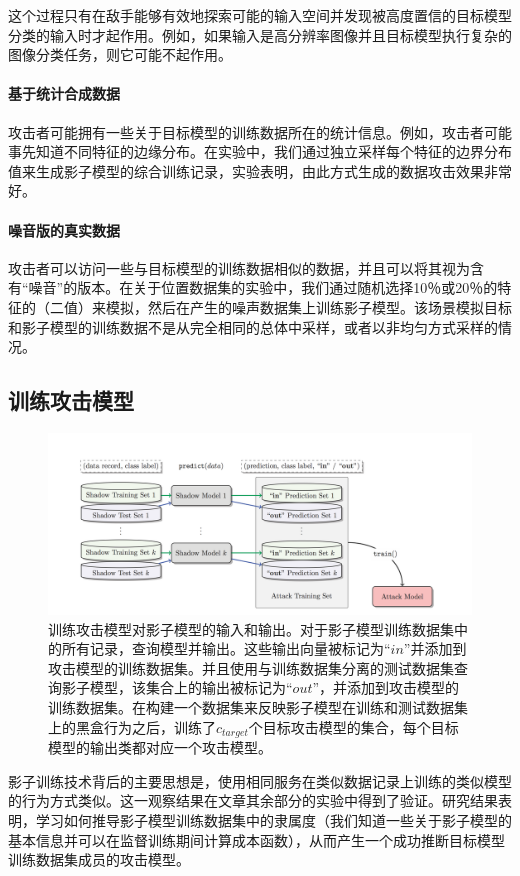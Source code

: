 \documentclass[a4paper]{article}
\begin{document}
这个过程只有在敌手能够有效地探索可能的输入空间并发现被高度置信的目标模型分类的输入时才起作用。例如，如果输入是高分辨率图像并且目标模型执行复杂的图像分类任务，则它可能不起作用。

\paragraph{基于统计合成数据}
攻击者可能拥有一些关于目标模型的训练数据所在的统计信息。例如，攻击者可能事先知道不同特征的边缘分布。在实验中，我们通过独立采样每个特征的边界分布值来生成影子模型的综合训练记录，实验表明，由此方式生成的数据攻击效果非常好。

\paragraph{噪音版的真实数据}
攻击者可以访问一些与目标模型的训练数据相似的数据，并且可以将其视为含有“噪音”的版本。在关于位置数据集的实验中，我们通过随机选择10％或20％的特征的（二值）来模拟，然后在产生的噪声数据集上训练影子模型。该场景模拟目标和影子模型的训练数据不是从完全相同的总体中采样，或者以非均匀方式采样的情况。

\subsection{训练攻击模型}

\begin{figure}
\includegraphics[width = \linewidth]{fig/training.png}
\caption{训练攻击模型对影子模型的输入和输出。对于影子模型训练数据集中的所有记录，查询模型并输出。这些输出向量被标记为$“in”$并添加到攻击模型的训练数据集。并且使用与训练数据集分离的测试数据集查询影子模型，该集合上的输出被标记为$“out”$，并添加到攻击模型的训练数据集。在构建一个数据集来反映影子模型在训练和测试数据集上的黑盒行为之后，训练了$c_{target}$个目标攻击模型的集合，每个目标模型的输出类都对应一个攻击模型。}
\end{figure}

影子训练技术背后的主要思想是，使用相同服务在类似数据记录上训练的类似模型的行为方式类似。这一观察结果在文章其余部分的实验中得到了验证。研究结果表明，学习如何推导影子模型训练数据集中的隶属度（我们知道一些关于影子模型的基本信息并可以在监督训练期间计算成本函数），从而产生一个成功推断目标模型训练数据集成员的攻击模型。
\end{document}
